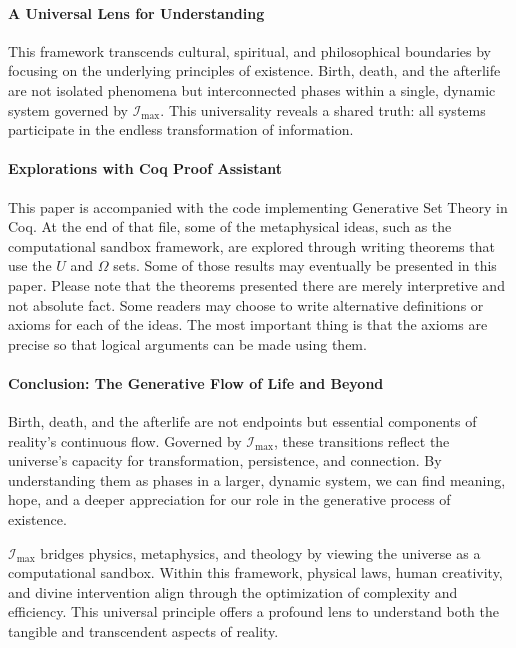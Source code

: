 \documentclass[12pt]{article}
\begin{document}
\paragraph{A Universal Lens for Understanding}
This framework transcends cultural, spiritual, and philosophical boundaries by focusing on the underlying principles of existence. Birth, death, and the afterlife are not isolated phenomena but interconnected phases within a single, dynamic system governed by \(\mathcal{I}_{\text{max}}\). This universality reveals a shared truth: all systems participate in the endless transformation of information.

\paragraph{Explorations with Coq Proof Assistant} This paper is accompanied with the code implementing Generative Set Theory in Coq. At the end of that file, some of the metaphysical ideas, such as the computational sandbox framework, are explored through writing theorems that use the $U$ and $\Omega$ sets. Some of those results may eventually be presented in this paper. Please note that the theorems presented there are merely interpretive and not absolute fact. Some readers may choose to write alternative definitions or axioms for each of the ideas. The most important thing is that the axioms are precise so that logical arguments can be made using them.

\paragraph{Conclusion: The Generative Flow of Life and Beyond}
Birth, death, and the afterlife are not endpoints but essential components of reality’s continuous flow. Governed by \(\mathcal{I}_{\text{max}}\), these transitions reflect the universe’s capacity for transformation, persistence, and connection. By understanding them as phases in a larger, dynamic system, we can find meaning, hope, and a deeper appreciation for our role in the generative process of existence.

\(\mathcal{I}_{\text{max}}\) bridges physics, metaphysics, and theology by viewing the universe as a computational sandbox. Within this framework, physical laws, human creativity, and divine intervention align through the optimization of complexity and efficiency. This universal principle offers a profound lens to understand both the tangible and transcendent aspects of reality.
\end{document}
